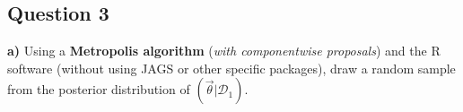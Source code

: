 \subsection*{Question 3}

\textbf{a)} Using a \textbf{Metropolis algorithm} (\textit{with componentwise proposals}) and the R software (without using JAGS or other specific packages), draw a random sample from the posterior distribution of $(\vec{\theta}|\mathcal{D}_1)$.